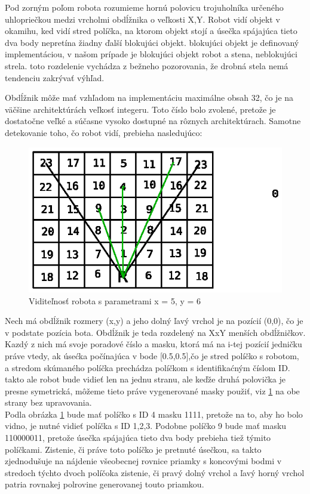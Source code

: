 \begin{definicia}
Pod zorným poľom robota rozumieme hornú polovicu trojuholníka určeného uhlopriečkou medzi vrcholmi obdĺžnika o veľkosti X,Y. Robot vidí objekt v okamihu, ked vidí stred políčka, na ktorom objekt stojí a úsečka spájajúca tieto dva body nepretína žiadny ďalší blokujúci objekt. blokujúci objekt je definovaný implementáciou, v našom prípade je blokujúci objekt robot a stena, neblokujúci strela. toto rozdelenie vychádza z bežneho pozorovania, že drobná stela nemá tendenciu zakrývať výhľad.
\end{definicia}
Obdĺžnik môže mať vzhľadom na implementáciu maximálne obsah 32, čo je na väčšine architektúrách veľkosť integeru. Toto číslo bolo zvolené, pretože je dostatočne veľké a súčasne vysoko dostupné na rôznych architektúrach. Samotne detekovanie toho, čo robot vidí, prebieha nasledujúco: \\
\begin{figure}
\centering
\includegraphics[totalheight=0.4\textheight,width=.8\textwidth]{visibility}
\caption {Viditeľnosť robota s parametrami x = 5, y = 6}
\label{visibility}
\end{figure}
Nech má obdĺžnik rozmery (x,y) a jeho dolný ľavý vrchol je na pozícií (0,0), čo je v podstate pozícia bota. Obdĺžnik je teda rozdelený na XxY menších obdĺžničkov. Kazdý z nich má svoje poradové číslo a masku, ktorá má na i-tej pozícií jedničku práve vtedy, ak úsećka počínajúca v bode [0.5,0.5],čo je stred políčko s robotom, a stredom skúmaného políčka prechádza políčkom s identifikaćným číslom ID. takto ale robot bude vidieť len na jednu stranu, ale keďže druhá polovička je presne symetrická, môžeme tieto práve vygenerované masky použiť, viz \ref{visibility}  na obe strany bez upravovania. \\
Podla obrázka \ref{visibility} bude mať políčko s ID 4 masku 1111, pretože na to, aby ho bolo vidno, je nutné vidieť políčka s ID 1,2,3. Podobne políčko 9 bude mať masku 110000011, pretože úsečka spájajúca tieto dva body prebieha tiež týmito políčkami. Zistenie, či práve toto políčko je pretnuté úsečkou, sa takto zjednodušuje na nájdenie všeobecnej rovnice priamky s koncovými bodmi v stredoch týchto dvoch políčoka zistenie, či pravý dolný vrchol a ľavý horný vrchol patria rovnakej polrovine generovanej touto priamkou.\\

